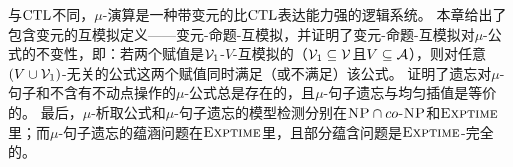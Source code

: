 与$\textrm{CTL}$不同，$\mu$-演算是一种带变元的比$\textrm{CTL}$表达能力强的逻辑系统。
本章给出了包含变元的互模拟定义——变元-命题-互模拟，并证明了变元-命题-互模拟对$\mu$-公式的不变性，即：若两个赋值是${\cal V}_1$-$V$-互模拟的（${\cal V}_1\subseteq {\cal V}$且$V\subseteq {\cal A}$），则对任意$(V\cup {\cal V}_1)$-无关的公式这两个赋值同时满足（或不满足）该公式。
证明了遗忘对$\mu$-句子和不含有不动点操作的$\mu$-公式总是存在的，且$\mu$-句子遗忘与均匀插值是等价的。
最后，$\mu$-析取公式和$\mu$-句子遗忘的模型检测分别在$\textsc{NP}\cap co$-$\textsc{NP}$和$\textsc{Exptime}$里；而$\mu$-句子遗忘的蕴涵问题在$\textsc{Exptime}$里，且部分蕴含问题是$\textsc{Exptime}$-完全的。


